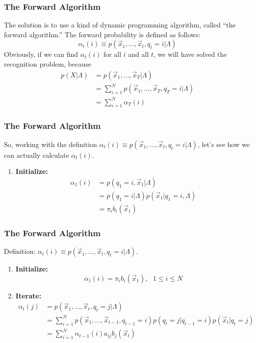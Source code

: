 \documentclass{beamer}
\begin{document}
\begin{frame}
  \frametitle{The Forward Algorithm}

  The solution is to use a kind of dynamic programming algorithm,
  called ``the forward algorithm.''  The forward probability is
  defined as follows:
  \[
  \alpha_t(i) \equiv p(\vec{x}_1,\ldots,\vec{x}_t,q_t=i|\Lambda)
  \]
  Obviously, if we can find $\alpha_t(i)$ for all $i$ and all $t$, we
  will have solved the recognition problem, because
  \begin{align*}
    p(X|\Lambda) &= p(\vec{x}_1,\ldots,\vec{x}_T|\Lambda)\\
    &= \sum_{i=1}^N p(\vec{x}_1,\ldots,\vec{x}_T,q_T=i|\Lambda)\\
    &= \sum_{i=1}^N \alpha_T(i)
  \end{align*}
\end{frame}
  
\begin{frame}
  \frametitle{The Forward Algorithm}

  So, working with the definition $\alpha_t(i) \equiv
  p(\vec{x}_1,\ldots,\vec{x}_t,q_t=i|\Lambda)$, let's see how we can
  actually calculate $\alpha_t(i)$.
  \begin{enumerate}
  \item {\bf Initialize:}
    \begin{align*}
      \alpha_1(i) &= p(q_1=i,\vec{x}_1|\Lambda)\\
      &= p(q_1=i|\Lambda)p(\vec{x}_1|q_1=i,\Lambda)\\
      &= \pi_i b_i(\vec{x}_1)
    \end{align*}
  \end{enumerate}
\end{frame}
  
\begin{frame}
  \frametitle{The Forward Algorithm}

  Definition: $\alpha_t(i) \equiv p(\vec{x}_1,\ldots,\vec{x}_t,q_t=i|\Lambda)$.
  \begin{enumerate}
  \item {\bf Initialize:}
    \[
    \alpha_1(i) = \pi_i b_i(\vec{x}_1),~~~1\le i\le N
    \]
  \item {\bf Iterate:}
    \begin{align*}
      \alpha_{t}(j) &= p(\vec{x}_1,\ldots,\vec{x}_t,q_t=j|\Lambda)\\
      &= \sum_{i=1}^N p(\vec{x}_1,\ldots,\vec{x}_{t-1},q_{t-1}=i)p(q_t=j|q_{t-1}=i)p(\vec{x}_t|q_t=j)\\
      &= \sum_{i=1}^N \alpha_{t-1}(i) a_{ij}b_j(\vec{x}_t)
    \end{align*}
  \end{enumerate}
\end{frame}
  
\end{document}
